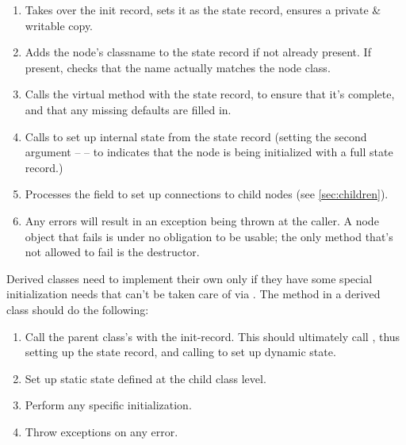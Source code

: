   \begin{enumerate}
  
  \item Takes over the init record,  sets it as the state record, ensures a
    private \& writable copy.
    
  \item Adds the node's classname to the state record if not already present.
    If present, checks that the name actually matches the node class.

  \item Calls the virtual  method with the state record,
    to ensure that it's complete, and that any missing defaults are filled in.

  \item Calls  to set up internal state from
    the state record (setting the second argument --  -- to
     indicates that the node is being initialized with a full
    state record.)

  \item Processes the  field to set up connections to child nodes
    (see \ref{sec:children}).

  \item Any errors will result in an exception being thrown at the caller. A
    node object that fails  is under no obligation to be usable; the
    only method that's not allowed to fail is the destructor.

  \end{enumerate}

  Derived classes need to implement their own  only if they have 
  some special initialization needs that can't be taken care of via
  . The  method in a derived class should do the
  following:

  \begin{enumerate}
  
  \item Call the parent class's  with the init-record. This should
    ultimately call , thus setting up the state record, and
    calling  to set up dynamic state.

  \item Set up static state defined at the child class level.
  
  \item Perform any specific initialization.

  \item Throw exceptions on any error. 

  \end{enumerate}
  
